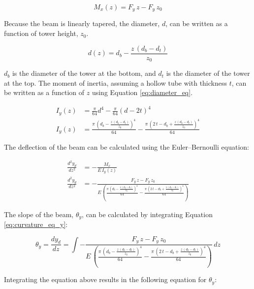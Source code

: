\begin{equation} \label{eq:moment}
	M_x(z) = F_{y}\,z-F_{y}\,z_{0}
\end{equation}

Because the beam is linearly tapered, the diameter, $d$, can be written as a function of tower height, $z_0$.

\begin{equation} \label{eq:diameter_eq}
	d(z) = d_{b}-\frac{z\,\left(d_{b}-d_{t}\right)}{z_{0}}
\end{equation}

$d_b$ is the diameter of the tower at the bottom, and $d_t$ is the diameter of the tower at the top.  The moment of inertia, assuming a hollow tube with thickness $t$, can be written as a function of $z$ using Equation \ref{eq:diameter_eq}.

\begin{align}
	I_y(z) &= \frac{\pi}{64}d^4 - \frac{\pi}{64}\left(d-2t \right)^4 \\
	I_y(z) &= \frac{\pi \,{\left(d_{b}-\frac{z\,\left(d_{b}-d_{t}\right)}{z_{0}}\right)}^4}{64}-\frac{\pi \,{\left(2\,t-d_{b}+\frac{z\,\left(d_{b}-d_{t}\right)}{z_{0}}\right)}^4}{64} \label{eq:y_moment_intertia}
\end{align}

The deflection of the beam can be calculated using the Euler–Bernoulli equation:

\begin{align}
	\frac{d^2 y_d}{dz^2} &= -\frac{M_x}{E\,I_y(z)} \\
	\frac{d^2 y_d}{dz^2} &= -\frac{F_{y}\,z-F_{y}\,z_{0}}{E\,\left(\frac{\pi \,{\left(d_{b}-\frac{z\,\left(d_{b}-d_{t}\right)}{z_{0}}\right)}^4}{64}-\frac{\pi \,{\left(2\,t-d_{b}+\frac{z\,\left(d_{b}-d_{t}\right)}{z_{0}}\right)}^4}{64}\right)}
 \label{eq:curvature_eq_y}
\end{align}

The slope of the beam, $\theta_y$, can be calculated by integrating Equation \ref{eq:curvature_eq_y}:

\begin{equation}
	\theta_y = \frac{dy_d}{dz} = \int{-\frac{F_{y}\,z-F_{y}\,z_{0}}{E\,\left(\frac{\pi \,{\left(d_{b}-\frac{z\,\left(d_{b}-d_{t}\right)}{z_{0}}\right)}^4}{64}-\frac{\pi \,{\left(2\,t-d_{b}+\frac{z\,\left(d_{b}-d_{t}\right)}{z_{0}}\right)}^4}{64}\right)}\,dz}
\end{equation}

Integrating the equation above results in the following equation for $\theta_y$:

